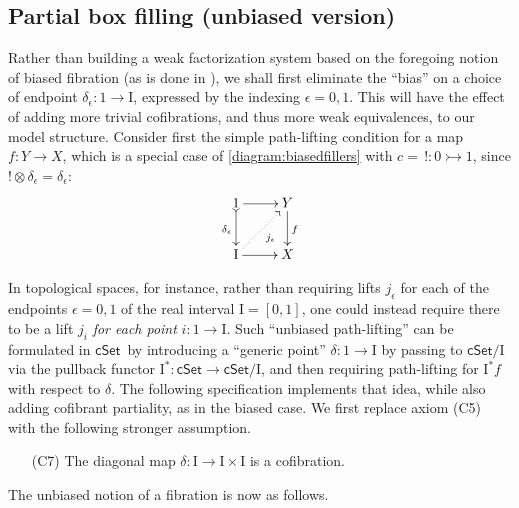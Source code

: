 \documentclass[12pt]{article}
\newcommand{\cSet}{\ensuremath{\mathsf{cSet}}}
\newcommand{\mono}{\ensuremath{\rightarrowtail}}
\newcommand{\ra}{\ensuremath{\rightarrow}}
\renewcommand{\to}{\ensuremath{\rightarrow}}
\newcommand{\I}{\ensuremath{\mathrm{I}}}
\theoremstyle{remark}
\theoremstyle{definition}
\newtheorem{definition}[theorem]{Definition}
\begin{document}
\subsection{Partial box filling (unbiased version)}\label{subsec:unbiasedfibration}


Rather than building a weak factorization system based on the foregoing notion of biased fibration (as is done in \cite{GS}), we shall first eliminate the ``bias'' on a choice of endpoint $\delta_\epsilon : 1 \ra \I$, expressed by the indexing $\epsilon = 0,1$.  This will have the effect of adding more trivial cofibrations, and thus more weak equivalences, to our model structure. Consider first the simple path-lifting condition for a map $f : Y \to X$, which is a special case of \eqref{diagram:biasedfillers} with $c =\, ! : 0\mono 1$, since $!\otimes\delta_\epsilon = \delta_\epsilon$:
\begin{equation*}
\xymatrix{
1 \ar@{>->}[d]_{\delta_\epsilon} \ar[r] & Y \ar[d]^f \\
\I \ar@{.>}[ru]_{j_\epsilon} \ar[r] & X
}
\end{equation*}

In topological spaces, for instance, rather than requiring lifts $j_\epsilon$ for each of the endpoints $\epsilon = 0,1$  of the real interval $\I = [0,1]$, one could instead require there to be a lift $j_i$ \emph{for each point} $i: 1\ra\I$. Such ``unbiased path-lifting'' can be formulated in \cSet\ by introducing a ``generic point'' $\delta : 1\ra \I$ by passing to $\cSet/\I$ via the pullback functor $\I^* : \cSet\to \cSet/\I$, and then requiring path-lifting for $\I^*f$ with respect to $\delta$.  The following specification implements that  idea, while also adding cofibrant partiality, as in the biased case.  We first replace axiom (C5) with the following stronger assumption.

\begin{enumerate}
\item[(C7)] The diagonal map $\delta : \I\ra\I\times\I$ is a cofibration.  
\end{enumerate}

The unbiased notion of a fibration is now as follows.

\end{document}
